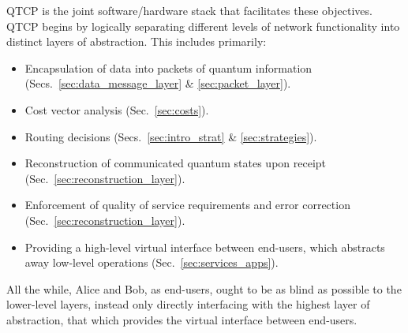 QTCP is the joint software/hardware stack that facilitates these objectives. QTCP begins by logically separating different levels of network functionality into distinct layers of abstraction. This includes primarily:
\begin{itemize}
	\item Encapsulation of data into packets of quantum information (Secs.~\ref{sec:data_message_layer} \& \ref{sec:packet_layer}).
	\item Cost vector analysis (Sec.~\ref{sec:costs}).
	\item Routing decisions (Secs.~\ref{sec:intro_strat} \& \ref{sec:strategies}).
	\item Reconstruction of communicated quantum states upon receipt (Sec.~\ref{sec:reconstruction_layer}).
	\item Enforcement of quality of service requirements and error correction (Sec.~\ref{sec:reconstruction_layer}).
	\item Providing a high-level virtual interface between end-users, which abstracts away low-level operations (Sec.~\ref{sec:services_apps}).
\end{itemize}

All the while, Alice and Bob, as end-users, ought to be as blind as possible to the lower-level layers, instead only directly interfacing with the highest layer of abstraction, that which provides the virtual interface between end-users.

